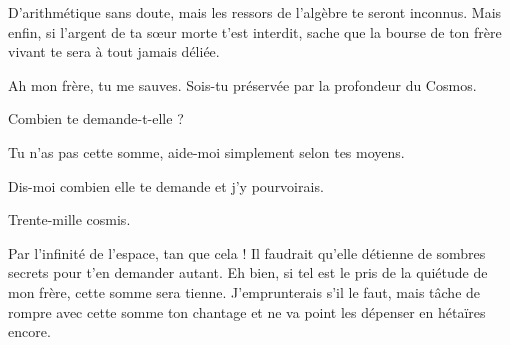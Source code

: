 \begin{drama}
  \elenaspeaks D’arithmétique sans doute, mais les ressors de l’algèbre te seront inconnus. Mais enfin, si l’argent de ta sœur morte t’est interdit, sache que la bourse de ton frère vivant te sera à tout jamais déliée.

  \vladimirspeaks Ah mon frère, tu me sauves. Sois-tu préservée par la profondeur du Cosmos.

  \elenaspeaks Combien te demande-t-elle ?

  \vladimirspeaks Tu n’as pas cette somme, aide-moi simplement selon tes moyens.

  \elenaspeaks Dis-moi combien elle te demande et j’y pourvoirais.

  \vladimirspeaks Trente-mille cosmis.

  \elenaspeaks Par l’infinité de l’espace, tan que cela ! Il faudrait qu’elle détienne de sombres secrets pour t’en demander autant. Eh bien, si tel est le pris de la quiétude de mon frère, cette somme sera tienne. J’emprunterais s’il le faut, mais tâche de rompre avec cette somme ton chantage et ne va point les dépenser en hétaïres encore.
\end{drama}

\scene

\StageDirII{\elena, \alexas}

